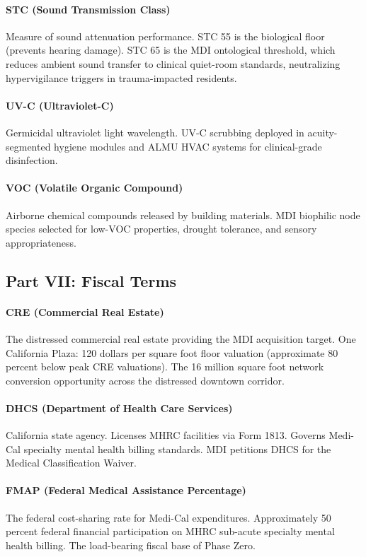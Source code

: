 {\paragraph{STC (Sound Transmission Class)} Measure of sound attenuation performance. STC 55 is the biological floor (prevents hearing damage). STC 65 is the MDI ontological threshold, which reduces ambient sound transfer to clinical quiet-room standards, neutralizing hypervigilance triggers in trauma-impacted residents.

\paragraph{UV-C (Ultraviolet-C)} Germicidal ultraviolet light wavelength. UV-C scrubbing deployed in acuity-segmented hygiene modules and ALMU HVAC systems for clinical-grade disinfection.

\paragraph{VOC (Volatile Organic Compound)} Airborne chemical compounds released by building materials. MDI biophilic node species selected for low-VOC properties, drought tolerance, and sensory appropriateness.

\subsection*{Part VII: Fiscal Terms}

\paragraph{CRE (Commercial Real Estate)} The distressed commercial real estate providing the MDI acquisition target. One California Plaza: 120 dollars per square foot floor valuation (approximate 80 percent below peak CRE valuations). The 16 million square foot network conversion opportunity across the distressed downtown corridor.

\paragraph{DHCS (Department of Health Care Services)} California state agency. Licenses MHRC facilities via Form 1813. Governs Medi-Cal specialty mental health billing standards. MDI petitions DHCS for the Medical Classification Waiver.

\paragraph{FMAP (Federal Medical Assistance Percentage)} The federal cost-sharing rate for Medi-Cal expenditures. Approximately 50 percent federal financial participation on MHRC sub-acute specialty mental health billing. The load-bearing fiscal base of Phase Zero.

}
